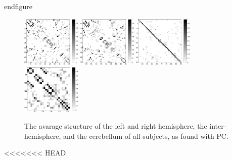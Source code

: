 \documentclass[a4paper, 10pt, english, onecolumn]{article}
\begin{document}
end{figure}

\begin{figure}[h!]
  \centering
  \includegraphics[width=0.25\textwidth]{images/struct_hemisphere_1_45}
  \includegraphics[width=0.25\textwidth]{images/struct_hemisphere_46_90}
  \includegraphics[width=0.25\textwidth]{images/struct_inter_hemisphere}
  \includegraphics[width=0.25\textwidth]{images/struct_cerebellum}  
  \caption{The avarage structure of the left and right hemisphere, the inter-hemisphere, and the cerebellum of all subjects, as found with PC.}
  \label{fig:struct_apart}
\end{figure}

<<<<<<< HEAD
\end{document}
